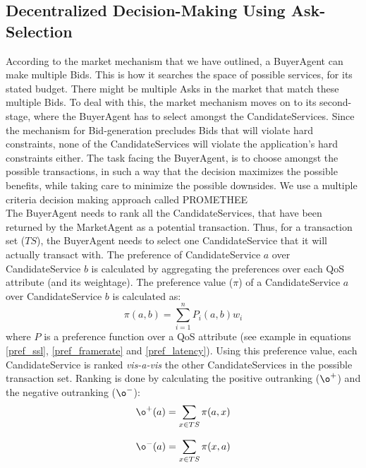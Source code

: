 \documentclass[10pt,journal,compsoc]{IEEEtran}
\begin{document}
\subsection{Decentralized Decision-Making Using Ask-Selection}\label{ask_selection}
According to the market mechanism that we have outlined, a BuyerAgent can make multiple Bids. This is how it searches the space of possible services, for its stated budget. There might be multiple Asks in the market that match these multiple Bids. To deal with this, the market mechanism moves on to its second-stage, where the BuyerAgent has to select amongst the CandidateServices. Since the mechanism for Bid-generation precludes Bids that will violate hard constraints, none of the CandidateServices will violate the application's hard constraints either. The task facing the BuyerAgent, is to choose amongst the possible transactions, in such a way that the decision maximizes the possible benefits, while taking care to minimize the possible downsides. We use a multiple criteria decision making approach called PROMETHEE~\cite{Brans1985Preference}\\
The BuyerAgent needs to rank all the CandidateServices, that have been returned by the MarketAgent as a potential transaction. Thus, for a transaction set ($TS$), the BuyerAgent needs to select one CandidateService that it will actually transact with. The preference of CandidateService $a$ over CandidateService $b$ is calculated by aggregating the preferences over each QoS attribute (and its weightage). The preference value ($\pi$) of a CandidateService $a$ over CandidateService $b$ is calculated as:
\begin{equation}
\pi(a,b) = \sum_{i=1}^{n} P_{i}(a,b)w_{i}
\end{equation}
where $P$ is a preference function over a QoS attribute (see example in equations \ref{pref_ssl}, \ref{pref_framerate} and \ref{pref_latency}). Using this preference value, each CandidateService is ranked \textit{vis-a-vis} the other CandidateServices in the possible transaction set. Ranking is done by calculating the positive outranking ($\o^{+}$) and the negative outranking ($\o^{-}$):
\begin{equation}
\o^{+}(a) = \sum_{x \in TS}\pi(a,x)
\label{positive_outranking}
\end{equation}

\begin{equation}
\o^{-}(a) = \sum_{x \in TS}\pi(x,a)
\label{negative_outranking}
\end{equation}
\end{document}

